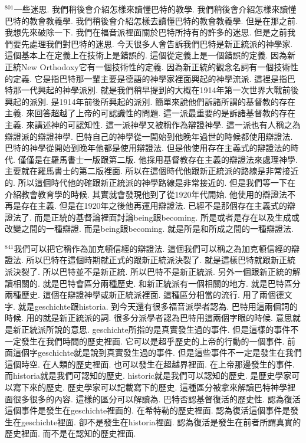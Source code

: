 \documentclass{book}
\begin{document}
$^{801}$一些迷思.
我們稍後會介紹怎樣來讀懂巴特的教學.
我們稍後會介紹怎樣來讀懂巴特的教會教義學.
我們稍後會介紹怎樣去讀懂巴特的教會教義學.
但是在那之前.
我想先來破除一下.
我們在福音派裡面關於巴特所持有的許多的迷思.
但是之前我們要先處理我們對巴特的迷思.
今天很多人會告訴我們巴特是新正統派的神學家.
這個基本上在定義上在技術上是錯誤的.
這個從定義上是一個錯誤的定義.
因為新正統New Orthodoxy它有一個技術性的定義.
因為新正統的觀念名詞有一個技術性的定義.
它是指巴特那一輩主要是德語的神學家裡面興起的神學流派.
這裡是指巴特那一代興起的神學派別.
就是我們稍早提到的大概在1914年第一次世界大戰前後興起的派別.
是1914年前後所興起的派別.
簡單來說他們訴諸所謂的基督教的存在主義.
來回答超越了上帝的可認識性的問題.
這一派最重要的是訴諸基督教的存在主義.
來講述神的可認知性.
這一派神學又被稱作為辯證神學.
這一派也有人稱之為辯證派的辯證神學.
巴特自己的神學從一開始到他晚年過世的時候都使用辯證法.
巴特的神學從開始到晚年他都是使用辯證法.
但是他使用存在主義式的辯證法的時代.
僅僅是在羅馬書士一版跟第二版.
他採用基督教存在主義的辯證法來處理神學.
主要就在羅馬書士的第二版裡面.
所以在這個時代他跟新正統派的路線是非常接近的.
所以這個時代他的確跟新正統派的神學路線是非常接近的.
但是我們等一下在介紹教會教育學的時候.
其實就會發現他到了從1920年代開始.
他使用的辯證法不再是存在主義.
但是在1920年之後他再運用辯證法.
已經不是那個存在主義式的辯證法了.
而是正統的基督論裡面討論being跟becoming.
所是或者是存在以及生成或改變之間的一種辯證.
而是being跟becoming.
就是所是和所成之間的一種辯證法.

$^{841}$我們可以把它稱作為加克頓信經的辯證法.
這個我們可以稱之為加克頓信經的辯證法.
所以巴特在這個時期就正式的跟新正統派決裂了.
就是這樣巴特就跟新正統派決裂了.
所以巴特並不是新正統.
所以巴特不是新正統派.
另外一個跟新正統的解讀相關的.
就是巴特會區分兩種歷史.
和新正統派有一個相關的地方.
就是巴特區分兩種歷史.
這個在辯證神學或新正統派裡面.
這種區分相當的流行.
用了兩個德文字.
就是geschichte跟historia.
到今天還有很多福音派學者認為.
巴特用這兩個詞的時候.
用的就是新正統派的詞.
很多分派學者認為巴特用這兩個字眼的時候.
意思就是新正統派所說的意思.
geschichte所指的是真實發生過的事件.
但是這樣的事件不一定發生在我們時間的歷史裡面.
它可以是超乎歷史的上帝的行動的一個事件.
前面這個字geschichte就是說到真實發生過的事件.
但是這些事件不一定是發生在我們這個時空.
在人類的歷史裡面.
也可以發生在超越界裡面.
在上帝那邊發生的事件.
而historia就是我們可認知的歷史.
historic就是我們可以認知的歷史.
是歷史學家可以寫下來的歷史.
歷史學家可以記載寫下的歷史.
這種區分被拿來解讀巴特神學裡面很多很多的內容.
這樣的區分可以解讀為.
巴特否認基督復活的歷史性.
認為復活這個事件是發生在geschichte裡面的.
在希特勒的歷史裡面.
認為復活這個事件是發生在geschichte裡面.
卻不是發生在historia裡面.
認為復活是發生在前者所謂真實的歷史裡面.
而不是在認知的歷史裡面.
\end{document}
